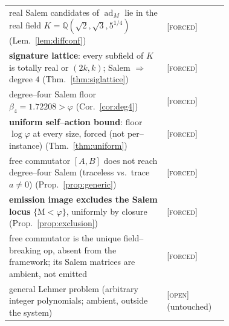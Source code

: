 \documentclass[11pt]{article}
\theoremstyle{plain}
\theoremstyle{definition}
\theoremstyle{remark}
\newcommand{\forced}{\textcolor{forcedc}{\textsc{[forced]}}}
\newcommand{\openq}{\textcolor{openc}{\textsc{[open]}}}
\newcommand{\Q}{\mathbb{Q}}
\newcommand{\Mah}{\mathrm{M}}
\begin{document}
\begin{center}
\begin{tabular}{@{}p{0.72\linewidth}l@{}}
real Salem candidates of $\operatorname{ad}_M$ lie in the real field $K=\Q(\sqrt2,\sqrt3,5^{1/4})$ (Lem.~\ref{lem:diffconf}) & \forced \\
\textbf{signature lattice}: every subfield of $K$ is totally real or $(2k,k)$; Salem $\Rightarrow$ degree $4$ (Thm.~\ref{thm:siglattice}) & \forced \\
degree--four Salem floor $\beta_4=1.72208>\varphi$ (Cor.~\ref{cor:deg4}) & \forced \\
\textbf{uniform self--action bound}: floor $\log\varphi$ at every size, forced (not per--instance) (Thm.~\ref{thm:uniform}) & \forced \\
free commutator $[A,B]$ does not reach degree--four Salem (traceless vs.\ trace $a\ne0$) (Prop.~\ref{prop:generic}) & \forced \\
\textbf{emission image excludes the Salem locus} $\{\Mah<\varphi\}$, uniformly by closure (Prop.~\ref{prop:exclusion}) & \forced \\
free commutator is the unique field--breaking op, absent from the framework; its Salem matrices are ambient, not emitted & \forced \\
\midrule
general Lehmer problem (arbitrary integer polynomials; ambient, outside the system) & \openq{} (untouched) \\
\bottomrule
\end{tabular}
\end{center}
\end{document}
